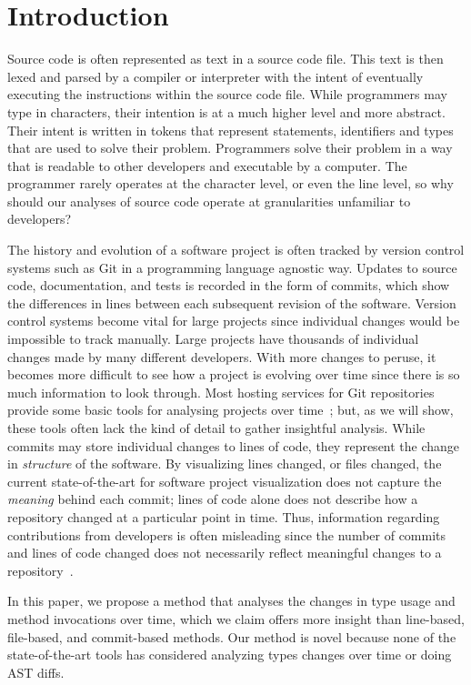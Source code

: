 \documentclass[conference]{IEEEtran}
\begin{document}
\section{Introduction}

Source code is often represented as text in a source code file. This text is then lexed and parsed by a compiler or interpreter with the intent of eventually executing the instructions within the source code file. While programmers may type in characters, their intention is at a much higher level and more abstract. Their intent is written in tokens that represent statements, identifiers and types that are used to solve their problem. Programmers solve their problem in a way that is readable to other developers and executable by a computer. The programmer rarely operates at the character level, or even the line level, so why should our analyses of source code operate at granularities unfamiliar to developers?

The history and evolution of a software project is often tracked by version control systems such as Git in a programming language agnostic way. Updates to source code, documentation, and tests is recorded in the form of commits, which show the differences in lines between each subsequent revision of the software. Version control systems become vital for large projects since individual changes would be impossible to track manually. Large projects have thousands of individual changes made by many different developers. With more changes to peruse, it becomes more difficult to see how a project is evolving over time since there is so much information to look through. Most hosting services for Git repositories provide some basic tools for analysing projects over time~\cite{github-graphs,bitbucket-graphs}; but, as we will show, these tools often lack the kind of detail to gather insightful analysis. While commits may store individual changes to lines of code, they represent the change in \emph{structure} of the software.  By visualizing lines changed, or files changed, the current state-of-the-art for software project visualization does not capture the \emph{meaning} behind each commit; lines of code alone does not describe how a repository changed at a particular point in time. Thus, information regarding contributions from developers is often misleading since the number of commits and lines of code changed does not necessarily reflect meaningful changes to a repository~\cite{robles2014}.

In this paper, we propose a method that analyses the changes in type usage and method invocations over time, which we claim offers more insight than line-based, file-based, and commit-based methods. Our method is novel because none of the state-of-the-art tools has considered analyzing types changes over time or doing AST diffs.
\end{document}

